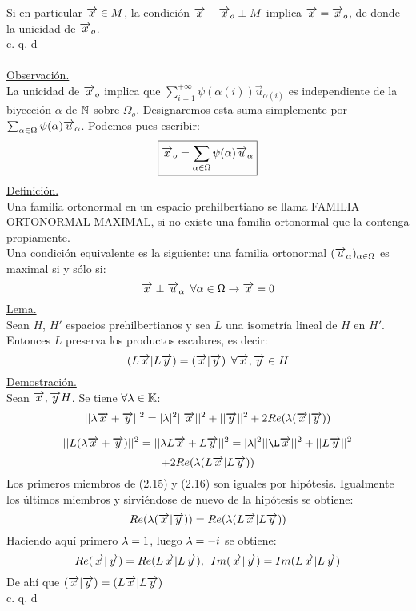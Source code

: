  Si en particular $\overrightarrow{x} \in M$, la condición $\overrightarrow{x} - \overrightarrow{x}_o \perp M$ implica $\overrightarrow{x}=\overrightarrow{x}_o$, de donde la unicidad de $\overrightarrow{x}_o$. \\
 \phantom{sssssssssssssssssssssssssssssssssss sasdasdasdasdadadssada} c. q. d \\ \\
 \underline{Observación.} \\
 La unicidad de $\overrightarrow{x}_o$ implica que $\sum_{i=1}^{+\infty} \psi (\alpha (i))  \overrightarrow{u}_{\alpha (i)}$ es independiente de la biyección $\alpha$ de $\mathbb{N}$ sobre $\Omega_o$. Designaremos esta suma simplemente por $\sum_{\alpha \in \Omega} \psi (\alpha )  \overrightarrow{u}_\alpha$. Podemos pues escribir:
 \begin{equation*}
 \boxed{\overrightarrow{x}_o=\sum_{\alpha \in \Omega} \psi (\alpha)\overrightarrow{u}_{\alpha} }
 \end{equation*}
 \underline{Definición.}\\
 Una familia ortonormal en un espacio prehilbertiano se llama FAMILIA ORTONORMAL MAXIMAL, si no existe una familia ortonormal que la contenga propiamente. \\
 Una condición equivalente es la siguiente: una familia ortonormal $(\overrightarrow{u}_{\alpha})_{\alpha \in \Omega}$ es maximal si y sólo si:
 $$
 \overrightarrow{x} \perp \overrightarrow{u}_{\alpha} \phantom{s} \forall \alpha \in \Omega \rightarrow \overrightarrow{x} =0
 $$
 \underline{Lema.} \\
 Sean $H$, $H'$ espacios prehilbertianos y sea $L$ una isometría lineal de $H$ en $H'$. Entonces $L$ preserva los productos escalares, es decir: \\
$$
(L\overrightarrow{x} | L\overrightarrow{y})= (\overrightarrow{x} | \overrightarrow{y} ) \phantom{s} \forall \overrightarrow{x} , \overrightarrow{y} \in H
$$
 \underline{Demostración.} \\
Sean $\overrightarrow{x} , \overrightarrow{y} H$. Se tiene $\forall \lambda \in \mathbb{K}$: \\
 \begin{equation}
 || \lambda \overrightarrow{x} +\overrightarrow{y} ||^2= | \lambda |^2 || \overrightarrow{x} ||^2 + || \overrightarrow{y} ||^2 + 2Re (\lambda (\overrightarrow{x} | \overrightarrow{y} ))
 \end{equation}
 
 \begin{equation}
|| L (\lam \xraya + \yraya ) ||^2= || \lam L\xraya + L\yraya ||^2=| \lam |^2 || \L\xraya ||^2 + ||L\yraya ||^2
 \end{equation}
 $$
 +2Re(\lambda(L\overrightarrow{x} | L\overrightarrow{y}))
 $$
Los primeros miembros de (2.15) y (2.16) son iguales por hipótesis. Igualmente los últimos miembros y sirviéndose de nuevo de la hipótesis se obtiene: 
$$
Re (\lambda (\overrightarrow{x} | \overrightarrow{y}))=Re(\lambda (L \overrightarrow{x} | L \overrightarrow{y} ))
$$
Haciendo aquí primero $\lambda=1$, luego $\lambda=-i$ se obtiene:
$$
Re(\overrightarrow{x} | \overrightarrow{y})=Re(L \overrightarrow{x} | L \overrightarrow{y} ), \phantom{s} Im(\overrightarrow{x} | \overrightarrow{y})=Im (L \overrightarrow{x} | L \overrightarrow{y} )$$
De ahí que $(\overrightarrow{x} | \overrightarrow{y} )=(L \overrightarrow{x} | L \overrightarrow{y} )$\\
 \phantom{sssssssssssssssssssssssssssssssssss sasdasdasdasdadadssada} c. q. d \\ \\
 
